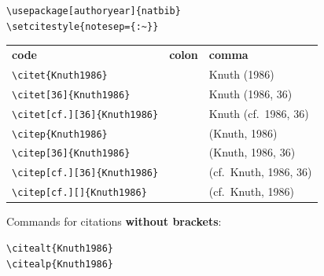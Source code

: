 \begin{frame}[fragile]


\begin{lstlisting}
\usepackage[authoryear]{natbib}
\setcitestyle{notesep={:~}}
\end{lstlisting}

\footnotesize

\begin{tabular}{lll}
\textbf{code}                               & \textbf{colon}            & \textbf{comma} \\

\lstinline|\citet{Knuth1986}|               & \citet{Knuth1986}               & Knuth (1986)   \\

\lstinline|\citet[36]{Knuth1986}|           & \citet[36]{Knuth1986}           & Knuth (1986, 36)   \\

\lstinline|\citet[cf.][36]{Knuth1986}| & \citet[cf.][36]{Knuth1986} & Knuth (cf.\ 1986, 36)  \\

\lstinline|\citep{Knuth1986}|               & \citep{Knuth1986}               & (Knuth, 1986)   \\

\lstinline|\citep[36]{Knuth1986}|     & \citep[36]{Knuth1986}           & (Knuth, 1986, 36) \\

\lstinline|\citep[cf.][36]{Knuth1986}|       & \citep[cf.][36]{Knuth1986}     & (cf.\ Knuth, 1986, 36)   \\

\lstinline|\citep[cf.][]{Knuth1986}|           & \citep[cf.][]{Knuth1986}       & (cf.\ Knuth, 1986)
\end{tabular}

%
%

\pause 

\bigskip

Commands for citations \textbf{without brackets}:

\begin{multicols}{2}
\begin{lstlisting}
\citealt{Knuth1986}
\citealp{Knuth1986}
\end{lstlisting}
\citealt{Knuth1986}\newline
\citealp{Knuth1986}
\end{multicols}


\end{frame}
